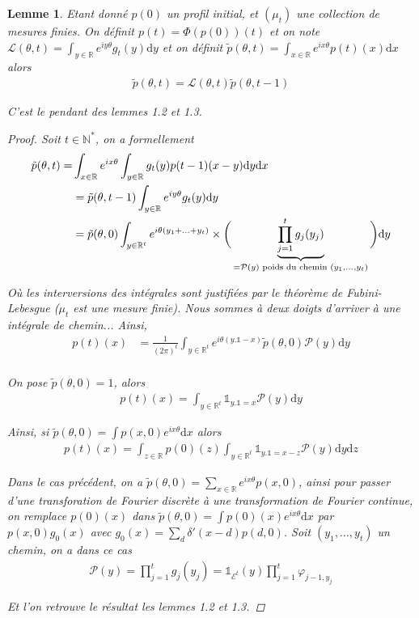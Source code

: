 \documentclass{article}
\newtheorem{lemma}[theorem]{Lemme}
\theoremstyle{definition}
\begin{document}
\begin{lemma}
	Etant donné $p(0)$ un profil initial, et $(\mu_t)$ une collection de mesures finies. On définit $p(t) = \Phi(p(0))(t)$ et on note $\mathcal{L}(\theta,t) = \int_{y\in\mathbb{R}}e^{iy \theta}g_t(y)\mathrm{d}y$ et on définit $\tilde{p}(\theta, t) = \int_{x\in\mathbb{R}} e^{i x \theta} p(t)(x)\mathrm{d}x$ alors 
	\begin{align*}
		\tilde{p}(\theta, t) = \mathcal{L}(\theta, t) \tilde{p}(\theta, t-1)
	\end{align*}

	C'est le pendant des lemmes 1.2 et 1.3.
	\begin{proof}
		Soit $t\in \mathbb{N}^*$, on a formellement
		\begin{align*}
			\tilde{p}(\theta, t) = &\int_{x\in\mathbb{R}}e^{ix\theta}\int_{y\in\mathbb{R}} g_t(y)p(t-1)(x-y)\mathrm{d}y\mathrm{d}x\\
			&= \tilde{p}(\theta, t-1)\int_{y\in\mathbb{R}}e^{iy\theta}g_t(y)\mathrm{d}y\\
			&= \tilde{p}(\theta, 0) \int_{y\in\mathbb{R}^t}e^{i\theta(y_1+\ldots+y_t)}\times\bigg(\underbrace{\prod_{j=1}^t g_j(y_j)}_{=\mathcal{P}(y) \textup{ poids du chemin } (y_1,\ldots, y_t)}\bigg)\mathrm{d}y
		\end{align*}

		Où les interversions des intégrales sont justifiées par le théorème de Fubini-Lebesgue ($\mu_t$ est une mesure finie). Nous sommes à deux doigts d'arriver à une intégrale de chemin... Ainsi,  
		\begin{align*}
			p(t)(x) &= \frac{1}{(2\pi)^t}\int_{y\in\mathbb{R}^t}e^{i\theta (y.\mathds{1}-x)}\tilde{p}(\theta, 0)\mathcal{P}(y) \mathrm{d}y\\
		\end{align*}

		On pose $\tilde{p}(\theta, 0)=1$, alors
		\begin{align*}
			p(t)(x) = \int_{y\in\mathbb{R}^t}\mathds{1}_{y.\mathds{1}=x} \mathcal{P}(y)\mathrm{d}y
		\end{align*}

		Ainsi, si $\tilde{p}(\theta, 0) = \int p(x,0)e^{i x \theta}\mathrm{d}x$ alors 
		\begin{align*}
			p(t)(x) = \int_{z\in\mathbb{R}} p(0)(z)\int_{y\in\mathbb{R}^t}\mathds{1}_{y.\mathds{1}=x-z}\mathcal{P}(y)\mathrm{d}y\mathrm{d}z
		\end{align*}

		Dans le cas précédent, on a $\tilde{p}(\theta, 0) = \sum_{x\in\mathbb{R}}e^{ix \theta}p(x,0)$, ainsi pour passer d'une transforation de Fourier discrète à une transformation de Fourier continue, on remplace $p(0)(x)$ dans $\tilde{p}(\theta, 0) = \int p(0)(x)e^{ix\theta}\mathrm{d}x$ par $p(x,0)g_0(x)$ avec $g_0(x) = \sum_{d}\delta'(x-d)p(d,0)$. Soit $(y_1,\ldots,y_t)$ un chemin, on a dans ce cas
		\begin{align*}
		\mathcal{P}(y) = \prod_{j=1}^t g_j(y_j) = \mathds{1}_{\mathcal{E}^t}(y) \prod_{j=1}^t \varphi_{j-1,y_j}
		\end{align*}

		Et l'on retrouve le résultat les lemmes 1.2 et 1.3.
	\end{proof}
\end{lemma}
\end{document}
